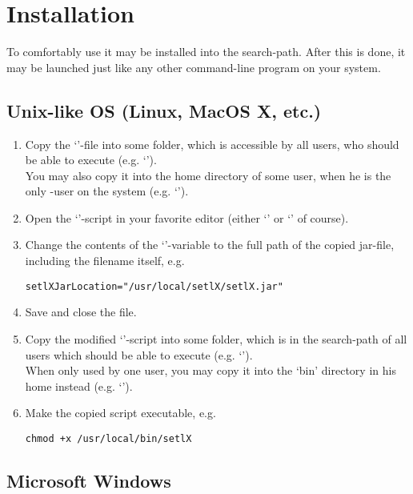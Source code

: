 \section{Installation}

To comfortably use \setlX{} it may be installed into the search-path. After this is done, it may be launched just like any other command-line program on your system.

\subsection{Unix-like OS (Linux, MacOS X, etc.)}\label{Unix}

\begin{enumerate}
	\item Copy the `'-file into some folder, which is accessible by all users, who should be able to execute \setlX{} (e.g. `').\\
	You may also copy it into the home directory of some user, when he is the only \setlX-user on the system (e.g. `').
	\item Open the `'-script in your favorite editor (either `' or `' of course).
	\item Change the contents of the `'-variable to the full path of the copied jar-file, including the filename itself, e.g.
\begin{lstlisting}[frame=none,numbers=none]
setlXJarLocation="/usr/local/setlX/setlX.jar"
\end{lstlisting}
	\item Save and close the file.
	\item Copy the modified `'-script into some folder, which is in the search-path of all users which should be able to execute \setlX{} (e.g. `').\\
	When only used by one user, you may copy it into the `bin' directory in his home instead (e.g. `').
	\item Make the copied script executable, e.g.
\begin{lstlisting}[frame=none,numbers=none]
chmod +x /usr/local/bin/setlX
\end{lstlisting}
\end{enumerate}

\subsection{Microsoft Windows}

